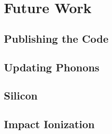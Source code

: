 
\section{Future Work}\label{future-work}

\subsection{Publishing the Code}\label{publishing-the-code}

\subsection{Updating Phonons}\label{updating-phonons}

\subsection{Silicon}\label{silicon}

\subsection{Impact Ionization}\label{impact-ionization}
